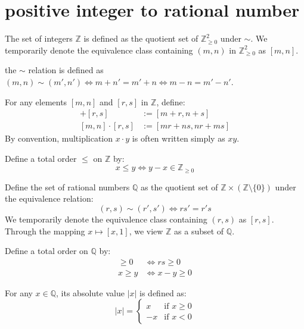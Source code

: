 \section{positive integer to rational number }

\begin{definition}
  The set of integers $\mathbb{Z}$ is defined as the quotient set of $\mathbb{Z}_{\geq 0}^2$ under $\sim$. We temporarily denote the equivalence class containing $(m,n)$ in $\mathbb{Z}_{\geq 0}^2$ as $[m,n]$.
\end{definition}

\begin{remark}
  the $\sim$ relation is defined as $(m,n)\sim(m',n')\iff m+n'=m'+n \iff m-n=m'-n'$.
\end{remark}

\begin{definition}
  For any elements $[m,n]$ and $[r,s]$ in $\mathbb{Z}$, define:
  \begin{align*}
    [m,n] + [r,s] &:= [m+r, n+s] \\
    [m,n] \cdot [r,s] &:= [mr+ns, nr+ms]
  \end{align*}
  By convention, multiplication $x \cdot y$ is often written simply as $xy$.
\end{definition}

\begin{definition}
  Define a total order $\leq$ on $\mathbb{Z}$ by:
  \[
    x \leq y \iff y-x \in \mathbb{Z}_{\geq 0}
  \]
\end{definition}

\begin{definition}
  Define the set of rational numbers $\mathbb{Q}$ as the quotient set of $\mathbb{Z} \times (\mathbb{Z} \setminus \{0\})$ under the equivalence relation:
  \[
    (r,s) \sim (r',s') \iff rs' = r's
  \]
  We temporarily denote the equivalence class containing $(r,s)$ as $[r,s]$. Through the mapping $x \mapsto [x,1]$, we view $\mathbb{Z}$ as a subset of $\mathbb{Q}$.
\end{definition}

\begin{definition}
  Define a total order on $\mathbb{Q}$ by:
  \begin{align*}
    [r,s] \geq 0 &\iff rs \geq 0 \\
    x \geq y &\iff x-y \geq 0
  \end{align*}

  For any $x \in \mathbb{Q}$, its absolute value $|x|$ is defined as:
  \[
    |x| =
    \begin{cases}
      x & \text{if } x \geq 0 \\
      -x & \text{if } x < 0
    \end{cases}
  \]
\end{definition}

